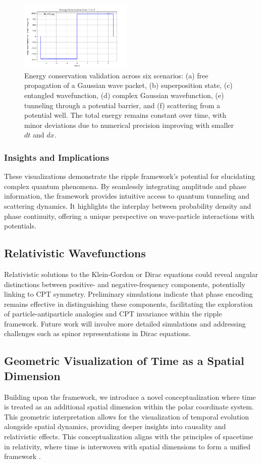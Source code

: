 \documentclass[12pt]{article}
\begin{document}
\begin{figure}[H]
    \includegraphics[width=0.48\textwidth]{images/energy_conservation_scattering.png}
    \caption{Energy conservation validation across six scenarios: (a) free propagation of a Gaussian wave packet, (b) superposition state, (c) entangled wavefunction, (d) complex Gaussian wavefunction, (e) tunneling through a potential barrier, and (f) scattering from a potential well. The total energy remains constant over time, with minor deviations due to numerical precision improving with smaller \(dt\) and \(dx\).}
    \label{fig:energy_conservation}
\end{figure}

\subsubsection{Insights and Implications}

These visualizations demonstrate the ripple framework’s potential for elucidating complex quantum phenomena. By seamlessly integrating amplitude and phase information, the framework provides intuitive access to quantum tunneling and scattering dynamics. It highlights the interplay between probability density and phase continuity, offering a unique perspective on wave-particle interactions with potentials.

\subsection{Relativistic Wavefunctions}
Relativistic solutions to the Klein-Gordon or Dirac equations could reveal angular distinctions between positive- and negative-frequency components, potentially linking to CPT symmetry. Preliminary simulations indicate that phase encoding remains effective in distinguishing these components, facilitating the exploration of particle-antiparticle analogies and CPT invariance within the ripple framework. Future work will involve more detailed simulations and addressing challenges such as spinor representations in Dirac equations.

\subsection{Geometric Visualization of Time as a Spatial Dimension}
Building upon the framework, we introduce a novel conceptualization where time is treated as an additional spatial dimension within the polar coordinate system. This geometric interpretation allows for the visualization of temporal evolution alongside spatial dynamics, providing deeper insights into causality and relativistic effects. This conceptualization aligns with the principles of spacetime in relativity, where time is interwoven with spatial dimensions to form a unified framework \cite{einstein1905}.
\end{document}
